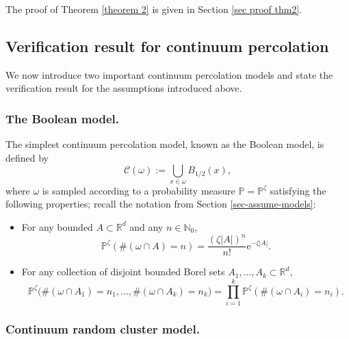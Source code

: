 \documentclass[11pt]{article}
\newcommand{\e}{\mathrm e}
\newcommand{\R}{\mathbb R}
\newcommand{\N}{\mathbb N}
\renewcommand{\P}{\mathbb P}
\theoremstyle{rem}
\begin{document}
The proof of Theorem \ref{theorem 2} is given in Section \ref{sec proof thm2}.

\subsection{Verification result for continuum percolation}\label{sec perc models}

We now introduce two important continuum percolation models and state the verification result for the assumptions introduced above.

\subsubsection{The Boolean model.}\label{sec Boolean}

The simplest continuum percolation model, known as the Boolean model, is defined by
\[
\mathcal C(\omega):=\bigcup_{x\in\omega}B_{1/2}(x),
\]
where $\omega$ is sampled according to a probability measure $\P=\P^\zeta$ satisfying the following properties; recall the notation from Section \ref{sec-assume-models}:
\begin{itemize}
\item For any bounded $A\subset\R^d$ and any $n\in\N_0$,
\begin{equation}\label{Poisson}
\P^\zeta(\#(\omega\cap A)=n)
=
\frac{(\zeta |A|)^n}{n!}
\e^{-\zeta|A|}.
\end{equation}

\item For any collection of disjoint bounded Borel sets
$A_1,\ldots,A_k\subset\R^d$,
\begin{equation}\label{iidPPP}
\P^\zeta
\big(
\#(\omega\cap A_1)=n_1,\ldots,\#(\omega\cap A_k)=n_k
\big)
=
\prod_{i=1}^k
\P^\zeta(\#(\omega\cap A_i)=n_i).
\end{equation}
\end{itemize}

\subsubsection{Continuum random cluster model.}\label{sec cluster model}
\end{document}

